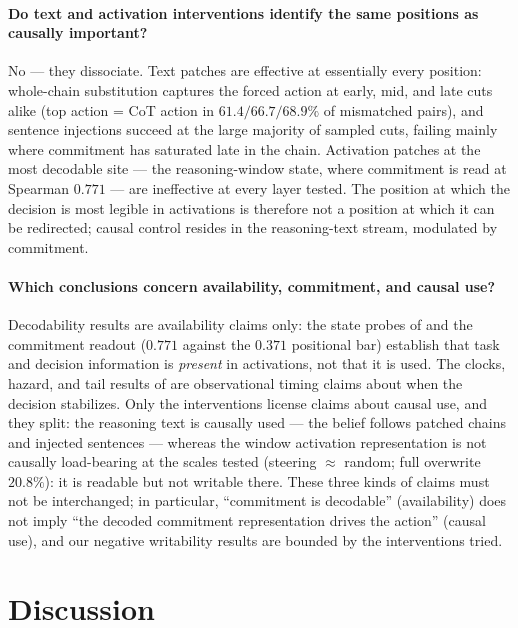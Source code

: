 \documentclass{article}
\begin{document}
\paragraph{Do text and activation interventions identify the same positions as causally important?}
No --- they dissociate.
Text patches are effective at essentially every position: whole-chain substitution captures the forced action at early, mid, and late cuts alike (top action = CoT action in \(61.4/66.7/68.9\%\) of mismatched pairs), and sentence injections succeed at the large majority of sampled cuts, failing mainly where commitment has saturated late in the chain.
Activation patches at the most decodable site --- the reasoning-window state, where commitment is read at Spearman \(0.771\) --- are ineffective at every layer tested.
The position at which the decision is most legible in activations is therefore not a position at which it can be redirected; causal control resides in the reasoning-text stream, modulated by commitment.

\paragraph{Which conclusions concern availability, commitment, and causal use?}
Decodability results are availability claims only: the state probes of  and the commitment readout (\(0.771\) against the \(0.371\) positional bar) establish that task and decision information is \emph{present} in activations, not that it is used.
The clocks, hazard, and tail results of  are observational timing claims about when the decision stabilizes.
Only the interventions license claims about causal use, and they split: the reasoning text is causally used --- the belief follows patched chains and injected sentences --- whereas the window activation representation is not causally load-bearing at the scales tested (steering \(\approx\) random; full overwrite \(20.8\%\)): it is readable but not writable there.
These three kinds of claims must not be interchanged; in particular, ``commitment is decodable'' (availability) does not imply ``the decoded commitment representation drives the action'' (causal use), and our negative writability results are bounded by the interventions tried.

\section{Discussion}
\label{sec:discussion}
\end{document}
